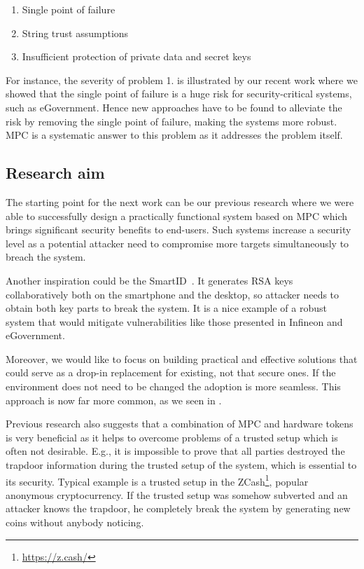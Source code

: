 \documentclass[
  digital, %
  twoside, %
  table,   %
  lof,     %
  lot,     %
]{fithesis3}
\theoremstyle{definition}
\theoremstyle{remark}
\begin{document}
\begin{enumerate}
	\item Single point of failure 
	\item String trust assumptions
	\item Insufficient protection of private data and secret keys 
\end{enumerate}
 
For instance, the severity of problem 1. is illustrated by our recent work \cite{2017-ccs-nemec} where we showed that the single point of failure is a huge risk for security-critical systems, such as eGovernment. Hence new approaches have to be found to alleviate the risk by removing the single point of failure, making the systems more robust. MPC is a systematic answer to this problem as it addresses the problem itself.

\subsection{Research aim}
The starting point for the next work can be our previous research \cite{2017-ccs-mavroudis} where we were able to successfully design a practically functional system based on MPC which brings significant security benefits to end-users. Such systems increase a security level as a potential attacker need to compromise more targets simultaneously to breach the system. 

Another inspiration could be the SmartID~\cite{smart_id_ee}. It generates RSA keys collaboratively both on the smartphone and the desktop, so attacker needs to obtain both key parts to break the system. It is a nice example of a robust system that would mitigate vulnerabilities like those presented in Infineon and eGovernment. 

Moreover, we would like to focus on building practical and effective solutions that could serve as a drop-in replacement for existing, not that secure ones. If the environment does not need to be changed the adoption is more seamless. This approach is now far more common, as we seen in \cite{smart_id_ee, DCMBR18}. %

Previous research also suggests that a combination of MPC and hardware tokens is very beneficial as it helps to overcome problems of a trusted setup which is often not desirable. E.g., it is impossible to prove that all parties destroyed the trapdoor information during the trusted setup of the system, which is essential to its security. Typical example is a trusted setup in the ZCash\footnote{\url{https://z.cash/}}, popular anonymous cryptocurrency. If the trusted setup was somehow subverted and an attacker knows the trapdoor, he completely break the system by generating new coins without anybody noticing.
\end{document}

